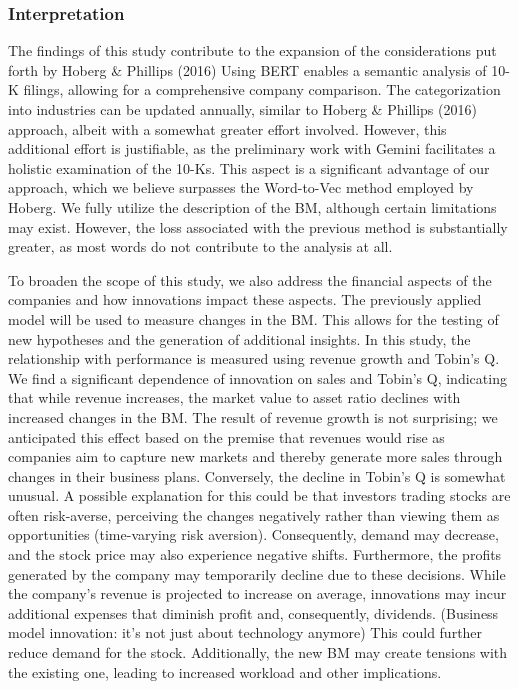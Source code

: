 \documentclass[
]{article}
\begin{document}
\subsubsection{Interpretation}\label{interpretation}

The findings of this study contribute to the expansion of the
considerations put forth by Hoberg \& Phillips (2016) Using BERT enables
a semantic analysis of 10-K filings, allowing for a comprehensive
company comparison. The categorization into industries can be updated
annually, similar to Hoberg \& Phillips (2016) approach, albeit with a
somewhat greater effort involved. However, this additional effort is
justifiable, as the preliminary work with Gemini facilitates a holistic
examination of the 10-Ks. This aspect is a significant advantage of our
approach, which we believe surpasses the Word-to-Vec method employed by
Hoberg. We fully utilize the description of the BM, although certain
limitations may exist. However, the loss associated with the previous
method is substantially greater, as most words do not contribute to the
analysis at all.

To broaden the scope of this study, we also address the financial
aspects of the companies and how innovations impact these aspects. The
previously applied model will be used to measure changes in the BM. This
allows for the testing of new hypotheses and the generation of
additional insights. In this study, the relationship with performance is
measured using revenue growth and Tobin's Q. We find a significant
dependence of innovation on sales and Tobin's Q, indicating that while
revenue increases, the market value to asset ratio declines with
increased changes in the BM. The result of revenue growth is not
surprising; we anticipated this effect based on the premise that
revenues would rise as companies aim to capture new markets and thereby
generate more sales through changes in their business plans. Conversely,
the decline in Tobin's Q is somewhat unusual. A possible explanation for
this could be that investors trading stocks are often risk-averse,
perceiving the changes negatively rather than viewing them as
opportunities (time-varying risk aversion). Consequently, demand may
decrease, and the stock price may also experience negative shifts.
Furthermore, the profits generated by the company may temporarily
decline due to these decisions. While the company's revenue is projected
to increase on average, innovations may incur additional expenses that
diminish profit and, consequently, dividends. (Business model
innovation: it's not just about technology anymore) This could further
reduce demand for the stock. Additionally, the new BM may create
tensions with the existing one, leading to increased workload and other
implications.
\end{document}

